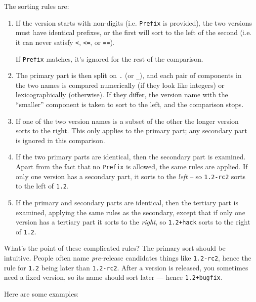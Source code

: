 \documentclass{article}
\newcommand{\code}[1]{\texttt{#1}}
\begin{document}
The sorting rules are:
\begin{enumerate}
  \item If the version starts with non-digits (i.e. \code{Prefix} is provided),
    the two versions must have identical prefixes, or the first will sort to the
    left of the second (i.e. it can never satisfy \code{<}, \code{<=}, or \code{==}).

    If \code{Prefix} matches, it's ignored for the rest of the comparison.

  \item The primary part is then split on \code{.} (or \code{\_}), and
    each pair of components in the two names is compared numerically (if they look like
    integers) or lexicographically (otherwise). If they differ, the version name
    with the ``smaller'' component is taken to sort to the left, and the comparison
    stops.

  \item If one of the two version names is a subset of the other
    the longer version sorts to the right.  This only applies to the
    primary part; any secondary part is ignored in this comparison.

  \item If the two primary parts are identical, then the secondary part is
    examined.  Apart from the fact that no \code{Prefix} is allowed, the same
    rules are applied.  If only one version has a secondary part, it sorts
    to the \emph{left} -- so \code{1.2-rc2} sorts to the left of \code{1.2}.

  \item If the primary and secondary parts are identical, then the tertiary part is
    examined, applying the same rules as the secondary, except that if only one
    version has a tertiary part it sorts to the \emph{right}, so \code{1.2+hack}
    sorts to the right of \code{1.2}.
\end{enumerate}

What's the point of these complicated rules?  The primary sort should be
intuitive.  People often name \emph{pre-}release candidates things like
\code{1.2-rc2}, hence the rule for \code{1.2} being later than \code{1.2-rc2}.
After a version is released, you sometimes need a fixed version, so its
name should sort later --- hence \code{1.2+bugfix}.

Here are some examples:
\end{document}

